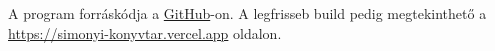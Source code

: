 \appendix
\chapter*{\fuggelek}
\setcounter{chapter}{\appendixnumber}

A program forráskódja a \href{https://OmTheTurtle/simonyi-konyvtar}{GitHub}-on. A legfrisseb build pedig megtekinthető a \href{https://simonyi-konyvtar.vercel.app}{https://simonyi-konyvtar.vercel.app} oldalon.
